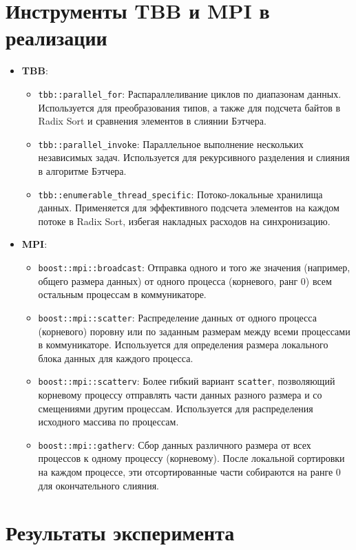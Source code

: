 \documentclass[12pt,a4paper]{extarticle}
\begin{document}
\section*{Инструменты TBB и MPI в реализации}
\begin{itemize}
    \item \textbf{TBB}:
    \begin{itemize}
        \item \texttt{tbb::parallel\_for}: Распараллеливание циклов по диапазонам данных. Используется для преобразования типов, а также для подсчета байтов в Radix Sort и сравнения элементов в слиянии Бэтчера.
        \item \texttt{tbb::parallel\_invoke}: Параллельное выполнение нескольких независимых задач. Используется для рекурсивного разделения и слияния в алгоритме Бэтчера.
        \item \texttt{tbb::enumerable\_thread\_specific}: Потоко-локальные хранилища данных. Применяется для эффективного подсчета элементов на каждом потоке в Radix Sort, избегая накладных расходов на синхронизацию.
    \end{itemize}
    
    \item \textbf{MPI}:
    \begin{itemize}
        \item \texttt{boost::mpi::broadcast}: Отправка одного и того же значения (например, общего размера данных) от одного процесса (корневого, ранг 0) всем остальным процессам в коммуникаторе.
        \item \texttt{boost::mpi::scatter}: Распределение данных от одного процесса (корневого) поровну или по заданным размерам между всеми процессами в коммуникаторе. Используется для определения размера локального блока данных для каждого процесса.
        \item \texttt{boost::mpi::scatterv}: Более гибкий вариант \texttt{scatter}, позволяющий корневому процессу отправлять части данных разного размера и со смещениями другим процессам. Используется для распределения исходного массива по процессам.
        \item \texttt{boost::mpi::gatherv}: Сбор данных различного размера от всех процессов к одному процессу (корневому). После локальной сортировки на каждом процессе, эти отсортированные части собираются на ранге 0 для окончательного слияния.
    \end{itemize}
\end{itemize}

	\section{Результаты эксперимента}
\end{document}
